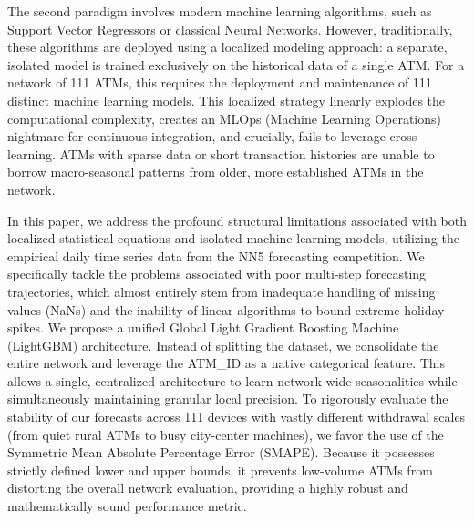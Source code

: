 \documentclass[conference, 12pt, onecolumn]{IEEEtran}
\begin{document}
The second paradigm involves modern machine learning algorithms, such as Support Vector Regressors or classical Neural Networks. However, traditionally, these algorithms are deployed using a localized modeling approach: a separate, isolated model is trained exclusively on the historical data of a single ATM. For a network of 111 ATMs, this requires the deployment and maintenance of 111 distinct machine learning models. This localized strategy linearly explodes the computational complexity, creates an MLOps (Machine Learning Operations) nightmare for continuous integration, and crucially, fails to leverage cross-learning. ATMs with sparse data or short transaction histories are unable to borrow macro-seasonal patterns from older, more established ATMs in the network.

In this paper, we address the profound structural limitations associated with both localized statistical equations and isolated machine learning models, utilizing the empirical daily time series data from the NN5 forecasting competition. We specifically tackle the problems associated with poor multi-step forecasting trajectories, which almost entirely stem from inadequate handling of missing values (NaNs) and the inability of linear algorithms to bound extreme holiday spikes. We propose a unified Global Light Gradient Boosting Machine (LightGBM) architecture. Instead of splitting the dataset, we consolidate the entire network and leverage the ATM\_ID as a native categorical feature. This allows a single, centralized architecture to learn network-wide seasonalities while simultaneously maintaining granular local precision. To rigorously evaluate the stability of our forecasts across 111 devices with vastly different withdrawal scales (from quiet rural ATMs to busy city-center machines), we favor the use of the Symmetric Mean Absolute Percentage Error (SMAPE). Because it possesses strictly defined lower and upper bounds, it prevents low-volume ATMs from distorting the overall network evaluation, providing a highly robust and mathematically sound performance metric.
\end{document}
